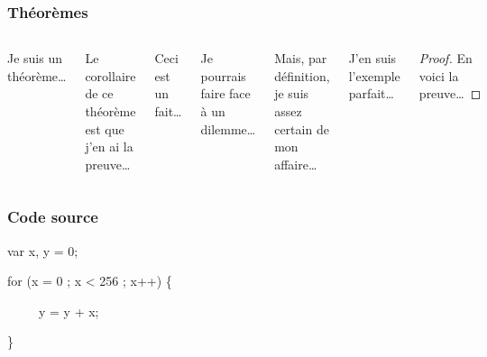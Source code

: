 \documentclass[aspectratio=1610,compress,t,english,french]{beamer}
\begin{document}
\begin{frame}
	\frametitle{Théorèmes}
	
	\begin{columns}
		\vspace{-7mm}
		\begin{theorem}
			Je suis un théorème\ldots
		\end{theorem}
	
		\begin{corollary}
			Le corollaire de ce théorème est que j'en ai la preuve\dots
		\end{corollary}
	
		\begin{fact}
			Ceci est un fait\ldots
		\end{fact}
	
		\begin{lemma}
			Je pourrais faire face à un dilemme\ldots
		\end{lemma}
	
		\vspace{-7mm}
		\begin{definition}
			Mais, par définition, je suis assez certain de mon affaire\dots
		\end{definition}
	
		\begin{example}
			J'en suis l'exemple parfait\dots
		\end{example}
	
		\begin{proof}
			En voici la preuve\dots
		\end{proof}
	\end{columns}
\end{frame}

\begin{frame}
	\frametitle{Code source}
	
	\begin{semiverbatim}
		var x, y = 0;
		
		for (x = 0 ; x < 256 ; x++) \{
			
		\ \ \ \ \ y = y + x;
				
		\}
	\end{semiverbatim}
\end{frame}
\end{document}
